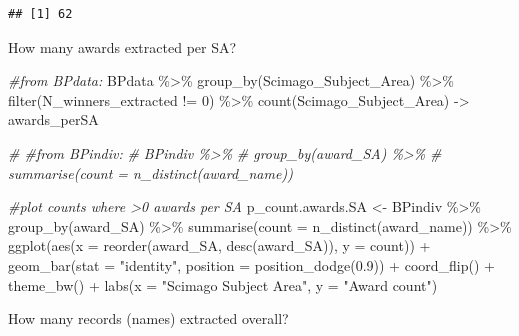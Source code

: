 \documentclass[
]{article}
\newenvironment{Shaded}{\begin{snugshade}}{\end{snugshade}}
\newcommand{\AttributeTok}[1]{\textcolor[rgb]{0.77,0.63,0.00}{#1}}
\newcommand{\CommentTok}[1]{\textcolor[rgb]{0.56,0.35,0.01}{\textit{#1}}}
\newcommand{\DecValTok}[1]{\textcolor[rgb]{0.00,0.00,0.81}{#1}}
\newcommand{\FloatTok}[1]{\textcolor[rgb]{0.00,0.00,0.81}{#1}}
\newcommand{\FunctionTok}[1]{\textcolor[rgb]{0.00,0.00,0.00}{#1}}
\newcommand{\NormalTok}[1]{#1}
\newcommand{\OtherTok}[1]{\textcolor[rgb]{0.56,0.35,0.01}{#1}}
\newcommand{\SpecialCharTok}[1]{\textcolor[rgb]{0.00,0.00,0.00}{#1}}
\newcommand{\StringTok}[1]{\textcolor[rgb]{0.31,0.60,0.02}{#1}}
\begin{document}
\begin{verbatim}
## [1] 62
\end{verbatim}

How many awards extracted per SA?

\begin{Shaded}
\begin{Highlighting}[]
\CommentTok{\#from BPdata:}
\NormalTok{BPdata }\SpecialCharTok{\%\textgreater{}\%} 
  \FunctionTok{group\_by}\NormalTok{(Scimago\_Subject\_Area) }\SpecialCharTok{\%\textgreater{}\%} 
  \FunctionTok{filter}\NormalTok{(N\_winners\_extracted }\SpecialCharTok{!=} \DecValTok{0}\NormalTok{) }\SpecialCharTok{\%\textgreater{}\%} 
  \FunctionTok{count}\NormalTok{(Scimago\_Subject\_Area) }\OtherTok{{-}\textgreater{}}\NormalTok{ awards\_perSA}

\CommentTok{\# \#from BPindiv:}
\CommentTok{\# BPindiv \%\textgreater{}\%  }
\CommentTok{\#   group\_by(award\_SA) \%\textgreater{}\%}
\CommentTok{\#   summarise(count = n\_distinct(award\_name))}

\CommentTok{\#plot counts where \textgreater{}0 awards per SA}
\NormalTok{p\_count.awards.SA }\OtherTok{\textless{}{-}}\NormalTok{ BPindiv }\SpecialCharTok{\%\textgreater{}\%} 
  \FunctionTok{group\_by}\NormalTok{(award\_SA) }\SpecialCharTok{\%\textgreater{}\%}
  \FunctionTok{summarise}\NormalTok{(}\AttributeTok{count =} \FunctionTok{n\_distinct}\NormalTok{(award\_name)) }\SpecialCharTok{\%\textgreater{}\%} 
  \FunctionTok{ggplot}\NormalTok{(}\FunctionTok{aes}\NormalTok{(}\AttributeTok{x =} \FunctionTok{reorder}\NormalTok{(award\_SA, }\FunctionTok{desc}\NormalTok{(award\_SA)), }\AttributeTok{y =}\NormalTok{ count)) }\SpecialCharTok{+}
  \FunctionTok{geom\_bar}\NormalTok{(}\AttributeTok{stat =} \StringTok{"identity"}\NormalTok{, }\AttributeTok{position =} \FunctionTok{position\_dodge}\NormalTok{(}\FloatTok{0.9}\NormalTok{)) }\SpecialCharTok{+}
  \FunctionTok{coord\_flip}\NormalTok{() }\SpecialCharTok{+}
  \FunctionTok{theme\_bw}\NormalTok{() }\SpecialCharTok{+}
  \FunctionTok{labs}\NormalTok{(}\AttributeTok{x =} \StringTok{"Scimago Subject Area"}\NormalTok{, }\AttributeTok{y =} \StringTok{"Award count"}\NormalTok{)  }
\end{Highlighting}
\end{Shaded}

How many records (names) extracted overall?

\begin{Shaded}
\end{Shaded}
\end{document}
